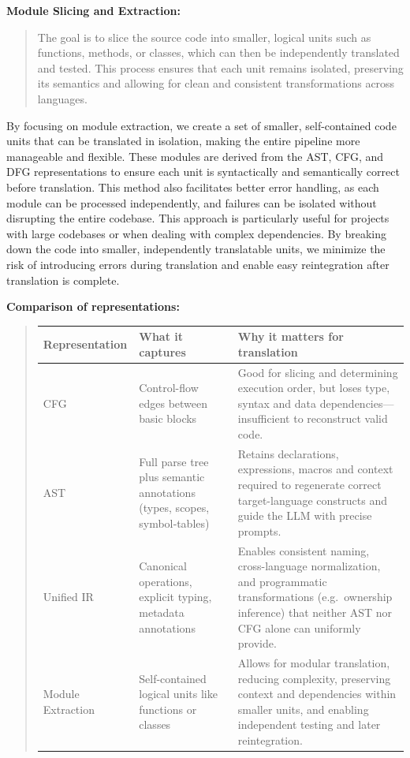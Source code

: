 \documentclass[twocolumn]{article}
\begin{document}
\medskip \noindent\textbf{Module Slicing and Extraction:} \begin{quote} The goal is to slice the source code into smaller, logical units such as functions, methods, or classes, which can then be independently translated and tested. This process ensures that each unit remains isolated, preserving its semantics and allowing for clean and consistent transformations across languages. \end{quote}
\medskip \noindent By focusing on module extraction, we create a set of smaller, self-contained code units that can be translated in isolation, making the entire pipeline more manageable and flexible. These modules are derived from the AST, CFG, and DFG representations to ensure each unit is syntactically and semantically correct before translation. This method also facilitates better error handling, as each module can be processed independently, and failures can be isolated without disrupting the entire codebase.
\medskip \noindent This approach is particularly useful for projects with large codebases or when dealing with complex dependencies. By breaking down the code into smaller, independently translatable units, we minimize the risk of introducing errors during translation and enable easy reintegration after translation is complete.

\medskip
\noindent\textbf{Comparison of representations:}
\begin{table}[htbp]
\begin{quote}
\begin{tabular}{p{4cm}p{5cm}p{6cm}}
\bf Representation & \bf What it captures & \bf Why it matters for translation \\\hline
CFG & Control-flow edges between basic blocks  
 & Good for slicing and determining execution order, but loses type, syntax and data dependencies—insufficient to reconstruct valid code. \\
AST & Full parse tree plus semantic annotations (types, scopes, symbol‐tables)  
 & Retains declarations, expressions, macros and context required to regenerate correct target-language constructs and guide the LLM with precise prompts. \\
Unified IR & Canonical operations, explicit typing, metadata annotations  
 & Enables consistent naming, cross-language normalization, and programmatic transformations (e.g.\ ownership inference) that neither AST nor CFG alone can uniformly provide. \\
Module Extraction & Self-contained logical units like functions or classes  
 & Allows for modular translation, reducing complexity, preserving context and dependencies within smaller units, and enabling independent testing and later reintegration. \\
\end{tabular}
\end{quote}
\end{table}
\end{document}
